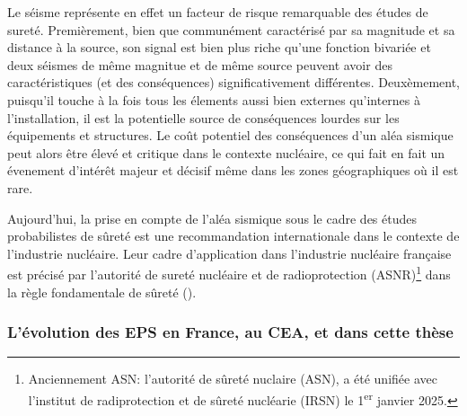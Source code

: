 Le séisme représente en effet un facteur de risque remarquable des études de sureté.
Premièrement, bien que communément caractérisé par sa magnitude et sa distance à la source, son signal est bien plus riche qu'une fonction bivariée et deux séismes de même magnitue et de même source peuvent avoir des caractéristiques (et des conséquences) significativement différentes.
Deuxèmement, puisqu'il touche à la fois tous les élements aussi bien externes qu'internes à l'installation, il est la potentielle source de conséquences lourdes sur les équipements et structures.
Le coût potentiel des conséquences d'un aléa sismique peut alors être élevé et critique dans le contexte nucléaire, ce qui fait en fait un évenement d'intérêt majeur et décisif même dans les zones géographiques où il est rare.



Aujourd'hui, la prise en compte de l'aléa sismique sous le cadre des études probabilistes de sûreté est une recommandation internationale dans le contexte de l'industrie nucléaire. Leur cadre d'application dans l'industrie nucléaire française est précisé par l'autorité de sureté nucléaire et de radioprotection (ASNR)\footnote{Anciennement ASN: l'autorité de sûreté nuclaire (ASN), a été unifiée avec l'institut de radiprotection et de sûreté nucléarie (IRSN) le 1\textsuperscript{er} janvier 2025.} dans la règle fondamentale de sûreté (\cite{asn_regle_2002}).









\subsubsection{L'évolution des EPS en France, au CEA, et dans cette thèse}






